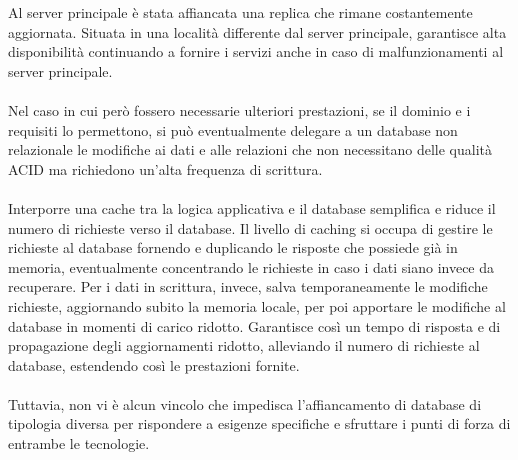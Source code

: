 Al server principale è stata affiancata una replica che rimane costantemente aggiornata.
Situata in una località differente dal server principale,
garantisce alta disponibilità continuando a fornire i servizi anche in caso di malfunzionamenti al server principale.\\
\\

Nel caso in cui però fossero necessarie ulteriori prestazioni,
se il dominio e i requisiti lo permettono,
si può eventualmente delegare a un database non relazionale le modifiche ai dati e alle relazioni
che non necessitano delle qualità ACID ma richiedono un’alta frequenza di scrittura.\\
\\
Interporre una cache tra la logica applicativa e il database
semplifica e riduce il numero di richieste verso il database.
Il livello di caching si occupa di gestire le richieste al database
fornendo e duplicando le risposte che possiede già in memoria,
eventualmente concentrando le richieste in caso i dati siano invece da recuperare.
Per i dati in scrittura, invece, salva temporaneamente le modifiche richieste,
aggiornando subito la memoria locale,
per poi apportare le modifiche al database in momenti di carico ridotto.
Garantisce così un tempo di risposta e di propagazione degli aggiornamenti ridotto,
alleviando il numero di richieste al database, estendendo così  le prestazioni fornite.\\
\\


Tuttavia, non vi è alcun vincolo che impedisca l'affiancamento di database di tipologia diversa
per rispondere a esigenze specifiche e sfruttare i punti di forza di entrambe le tecnologie.
\\
\clearpage
